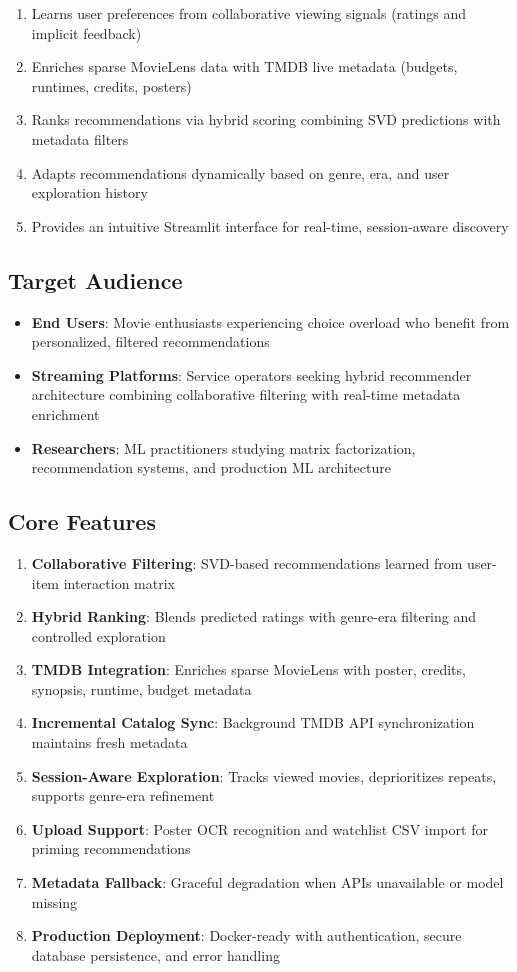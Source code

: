 \documentclass[11pt,a4paper]{article}
\begin{document}
\begin{enumerate}
    \item Learns user preferences from collaborative viewing signals (ratings and implicit feedback)
    \item Enriches sparse MovieLens data with TMDB live metadata (budgets, runtimes, credits, posters)
    \item Ranks recommendations via hybrid scoring combining SVD predictions with metadata filters
    \item Adapts recommendations dynamically based on genre, era, and user exploration history
    \item Provides an intuitive Streamlit interface for real-time, session-aware discovery
\end{enumerate}

\subsection{Target Audience}

\begin{itemize}
    \item \textbf{End Users}: Movie enthusiasts experiencing choice overload who benefit from personalized, filtered recommendations
    \item \textbf{Streaming Platforms}: Service operators seeking hybrid recommender architecture combining collaborative filtering with real-time metadata enrichment
    \item \textbf{Researchers}: ML practitioners studying matrix factorization, recommendation systems, and production ML architecture
\end{itemize}

\subsection{Core Features}

\begin{enumerate}
    \item \textbf{Collaborative Filtering}: SVD-based recommendations learned from user-item interaction matrix
    \item \textbf{Hybrid Ranking}: Blends predicted ratings with genre-era filtering and controlled exploration
    \item \textbf{TMDB Integration}: Enriches sparse MovieLens with poster, credits, synopsis, runtime, budget metadata
    \item \textbf{Incremental Catalog Sync}: Background TMDB API synchronization maintains fresh metadata
    \item \textbf{Session-Aware Exploration}: Tracks viewed movies, deprioritizes repeats, supports genre-era refinement
    \item \textbf{Upload Support}: Poster OCR recognition and watchlist CSV import for priming recommendations
    \item \textbf{Metadata Fallback}: Graceful degradation when APIs unavailable or model missing
    \item \textbf{Production Deployment}: Docker-ready with authentication, secure database persistence, and error handling
\end{enumerate}
\end{document}
